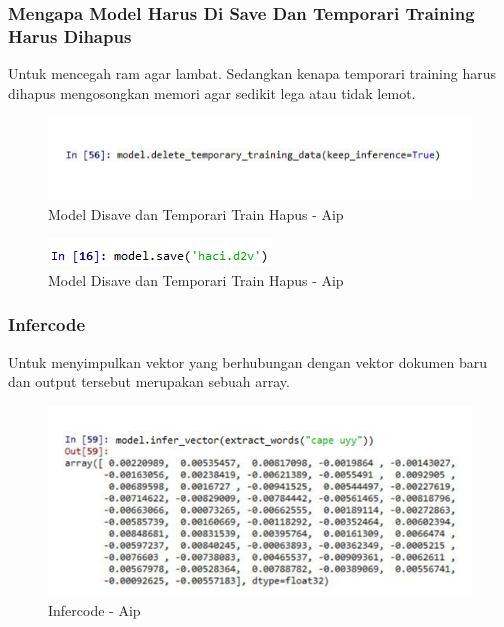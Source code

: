 \subsubsection{Mengapa Model Harus Di Save Dan Temporari Training Harus Dihapus}
Untuk mencegah ram agar lambat. Sedangkan kenapa temporari training harus dihapus mengosongkan memori agar sedikit lega atau tidak lemot.
\begin{figure}[ht]
\centering
\includegraphics[scale=0.3]{figures/AIP/e24.PNG}
\caption{Model Disave dan Temporari Train Hapus - Aip}
\label{Model Disave dan Temporari Train Hapus - Aip}
\end{figure}

\begin{figure}[ht]
\centering
\includegraphics[scale=0.3]{figures/AIP/e25.PNG}
\caption{Model Disave dan Temporari Train Hapus - Aip}
\label{Model Disave dan Temporari Train Hapus - Aip}
\end{figure}

\subsubsection{Infercode}
Untuk menyimpulkan vektor yang berhubungan dengan vektor dokumen baru dan output tersebut merupakan sebuah array.
\begin{figure}[ht]
\centering
\includegraphics[scale=0.3]{figures/AIP/e26.PNG}
\caption{Infercode - Aip}
\label{Infercode - Aip}
\end{figure}

